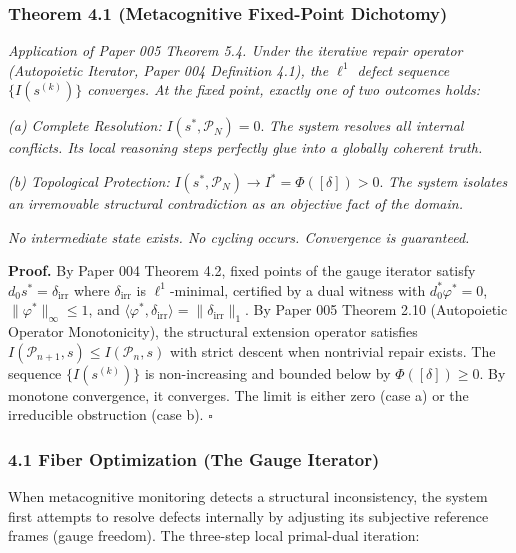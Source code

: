 \documentclass[
]{article}
\begin{document}
\subsubsection{Theorem 4.1 (Metacognitive Fixed-Point
Dichotomy)}\label{theorem-4.1-metacognitive-fixed-point-dichotomy}

\emph{Application of Paper 005 Theorem 5.4. Under the iterative repair
operator (Autopoietic Iterator, Paper 004 Definition 4.1), the
\(\ell^1\) defect sequence \(\{I(s^{(k)})\}\) converges. At the fixed
point, exactly one of two outcomes holds:}

\emph{(a) Complete Resolution:} \(I(s^*, \mathcal{P}_N) = 0\). \emph{The
system resolves all internal conflicts. Its local reasoning steps
perfectly glue into a globally coherent truth.}

\emph{(b) Topological Protection:}
\(I(s^*, \mathcal{P}_N) \to I^* = \Phi([\delta]) > 0\). \emph{The system
isolates an irremovable structural contradiction as an objective fact of
the domain.}

\emph{No intermediate state exists. No cycling occurs. Convergence is
guaranteed.}

\textbf{Proof.} By Paper 004 Theorem 4.2, fixed points of the gauge
iterator satisfy \(d_0 s^* = \delta_{\mathrm{irr}}\) where
\(\delta_{\mathrm{irr}}\) is \(\ell^1\)-minimal, certified by a dual
witness with \(d_0^* \varphi^* = 0\), \(\|\varphi^*\|_\infty \leq 1\),
and
\(\langle \varphi^*, \delta_{\mathrm{irr}} \rangle = \|\delta_{\mathrm{irr}}\|_1\).
By Paper 005 Theorem 2.10 (Autopoietic Operator Monotonicity), the
structural extension operator satisfies
\(I(\mathcal{P}_{n+1}, s) \leq I(\mathcal{P}_n, s)\) with strict descent
when nontrivial repair exists. The sequence \(\{I(s^{(k)})\}\) is
non-increasing and bounded below by \(\Phi([\delta]) \geq 0\). By
monotone convergence, it converges. The limit is either zero (case a) or
the irreducible obstruction (case b). \(\square\)

\subsubsection{4.1 Fiber Optimization (The Gauge
Iterator)}\label{fiber-optimization-the-gauge-iterator}

When metacognitive monitoring detects a structural inconsistency, the
system first attempts to resolve defects internally by adjusting its
subjective reference frames (gauge freedom). The three-step local
primal-dual iteration:
\end{document}
